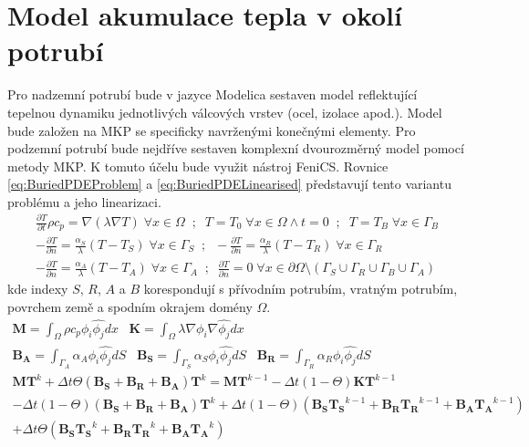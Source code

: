 \section{Model akumulace tepla v okolí potrubí}
\label{sec:PipeAcu}
Pro nadzemní potrubí bude v jazyce Modelica sestaven model reflektující
tepelnou dynamiku jednotlivých válcových vrstev (ocel, izolace apod.). Model
bude založen na MKP se specificky navrženými konečnými elementy. Pro
podzemní potrubí bude nejdříve sestaven komplexní dvourozměrný model pomocí
metody MKP. K tomuto účelu bude využit nástroj FeniCS. Rovnice
\ref{eq:BuriedPDEProblem} a \ref{eq:BuriedPDELinearised} představují tento
variantu problému a jeho linearizaci.
\begin{equation}
  \label{eq:BuriedPDEProblem}
  \begin{gathered}
    \frac{\partial{T}}{\partial{t}}\rho c_p = \nabla(\lambda\nabla T)\;
    \forall{x} \in\Omega\;\;;\;\;
    T = T_0\;\forall{x}\in\Omega \land t=0\;\;;\;\;
    T=T_B\;\forall{x}\in\Gamma_B \\
    -\frac{\partial{T}}{\partial{n}}=\frac{\alpha_S}{\lambda}(T-T_S)\;
    \forall{x}\in\Gamma_S \;\;;\;\;
    -\frac{\partial{T}}{\partial{n}}=\frac{\alpha_R}{\lambda}(T-T_R)\;
    \forall{x}\in\Gamma_R \\
    -\frac{\partial{T}}{\partial{n}}=\frac{\alpha_A}{\lambda}(T-T_A)\;
    \forall{x}\in\Gamma_A \;\;;\;\;
    \frac{\partial{T}}{\partial{n}}=0\;\forall{x}\in\partial\Omega \setminus
    (\Gamma_S \cup \Gamma_R \cup \Gamma_B \cup \Gamma_A)
  \end{gathered}
\end{equation}
kde indexy \(S\), \(R\), \(A\) a \(B\) korespondují s přívodním potrubím,
vratným potrubím, povrchem země a spodním okrajem domény \(\Omega\).
\begin{equation}
  \label{eq:BuriedPDELinearised}
  \begin{gathered}
    \boldsymbol{M}=\int_\Omega\rho c_p\phi_i \hat{\phi_j}dx\;\;\;
    \boldsymbol{K}=\int_\Omega\lambda\nabla\phi_i\nabla\hat{\phi_j}dx\;\;\;\\
    \boldsymbol{B_A}=\int_{\Gamma_A}\alpha_A\phi_i\hat{\phi_j}dS\;\;\;
    \boldsymbol{B_S}=\int_{\Gamma_S}\alpha_S\phi_i\hat{\phi_j}dS\;\;\;
    \boldsymbol{B_R}=\int_{\Gamma_R}\alpha_R\phi_i\hat{\phi_j}dS\;\;\;\\
    \boldsymbol{MT}^k+\Delta{t}\Theta(\boldsymbol{B_S}+\boldsymbol{B_R}+
    \boldsymbol{B_A})\boldsymbol{T}^k
    =\boldsymbol{MT}^{k-1}-\Delta{t}(1-\Theta)\boldsymbol{KT}^{k-1}\\
    -\Delta{t}(1-\Theta)(\boldsymbol{B_S}+\boldsymbol{B_R}+\boldsymbol{B_A})
    \boldsymbol{T}^k
    +\Delta{t}(1-\Theta)(\boldsymbol{B_ST_S}^{k-1}+\boldsymbol{B_RT_R}^{k-1}+
    \boldsymbol{B_AT_A}^{k-1})\\+\Delta{t}\Theta(\boldsymbol{B_ST_S}^k
    +\boldsymbol{B_RT_R}^k+\boldsymbol{B_AT_A}^k)
  \end{gathered}
\end{equation}
